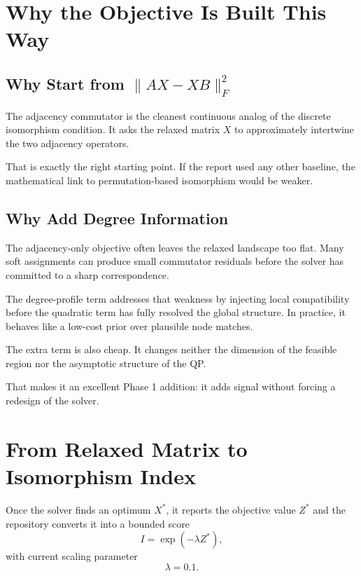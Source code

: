 \documentclass[11pt]{article}
\begin{document}
\section{Why the Objective Is Built This Way}

\subsection{Why Start from $\|AX - XB\|_F^2$}

The adjacency commutator is the cleanest continuous analog of the discrete isomorphism condition.
It asks the relaxed matrix $X$ to approximately intertwine the two adjacency operators.

That is exactly the right starting point.
If the report used any other baseline, the mathematical link to permutation-based isomorphism would be weaker.

\subsection{Why Add Degree Information}

The adjacency-only objective often leaves the relaxed landscape too flat.
Many soft assignments can produce small commutator residuals before the solver has committed to a sharp correspondence.

The degree-profile term addresses that weakness by injecting local compatibility before the quadratic term has fully resolved the global structure.
In practice, it behaves like a low-cost prior over plausible node matches.

The extra term is also cheap.
It changes neither the dimension of the feasible region nor the asymptotic structure of the QP.

That makes it an excellent Phase 1 addition:
it adds signal without forcing a redesign of the solver.

\section{From Relaxed Matrix to Isomorphism Index}

Once the solver finds an optimum $X^*$, it reports the objective value $Z^*$ and the repository converts it into a bounded score
\begin{equation}
I = \exp(-\lambda Z^*),
\end{equation}
with current scaling parameter
\begin{equation}
\lambda = 0.1.
\end{equation}
\end{document}
